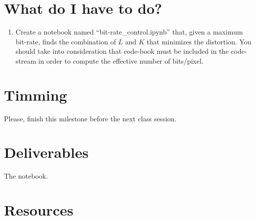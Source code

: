 

\section{What do I have to do?}

\begin{enumerate}
\item Create a notebook named ``bit-rate\_control.ipynb'' that, given
  a maximum bit-rate, finds the combination of $L$ and $K$ that
  minimizes the distortion. You should take into consideration that
  code-book must be included in the code-stream in order to compute
  the effective number of bits/pixel.
\end{enumerate}


\section{Timming}

Please, finish this milestone before the next class session.

\section{Deliverables}

The notebook.

\section{Resources}

\renewcommand{\addcontentsline}[3]{} %

